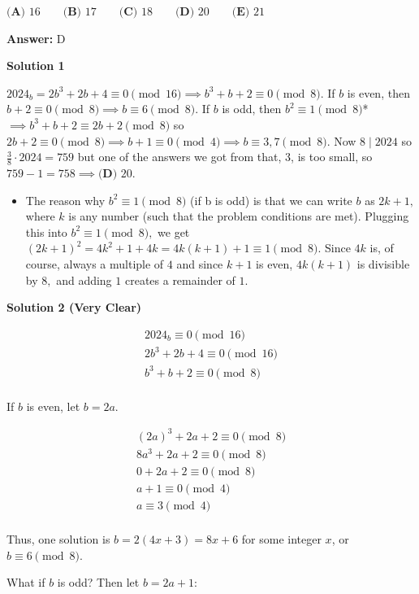 \begin{enumerate}
 $\textbf{(A) }16\qquad\textbf{(B) }17\qquad\textbf{(C) }18\qquad\textbf{(D) }20\qquad\textbf{(E) }21$

 \textbf{Answer: }D



\textbf{Solution 1}

$2024_b = 2b^3+2b+4\equiv 0\pmod{16}\implies b^3+b+2\equiv 0\pmod 8$. If $b$ is even, then $b+2\equiv 0\pmod 8\implies b\equiv 6\pmod 8$. If $b$ is odd, then $b^2\equiv 1\pmod 8$* $\implies b^3+b+2\equiv 2b+2\pmod 8$ so $2b+2\equiv 0\pmod 8\implies b+1\equiv 0\pmod 4\implies b\equiv 3,7\pmod 8$. Now $8\mid 2024$ so $\frac38\cdot 2024=759$ but one of the answers we got from that, $3$, is too small, so $759 - 1 = 758\implies\boxed{\textbf{(D) }20}$.

 
            \begin{itemize}
        \item The reason why $b^2\equiv 1\pmod 8$ (if b is odd) is that we can write $b$ as $2k+1,$ where $k$ is any number (such that the problem conditions are met). Plugging this into $b^2\equiv 1\pmod 8,$ we get $(2k+1)^2=4k^2+1+4k=4k(k+1)+1\equiv 1\pmod 8.$ Since $4k$ is, of course, always a multiple of $4$ and since $k+1$ is even, $4k(k+1)$ is divisible by $8,$ and adding $1$ creates a remainder of $1.$
            \end{itemize}
            



\textbf{Solution 2 (Very Clear)}

\begin{align*}2024_b\equiv0\pmod{16} \\2b^3+2b+4\equiv0\pmod{16} \\b^3+b+2\equiv0\pmod8 \\\end{align*}


 If $b$ is even, let $b=2a$. 

 \begin{align*}(2a)^3+2a+2\equiv0\pmod8 \\8a^3+2a+2\equiv0\pmod8 \\0+2a+2\equiv0\pmod8 \\a+1\equiv0\pmod4 \\a\equiv3\pmod4 \\\end{align*}


 Thus, one solution is $b=2(4x+3)=8x+6$ for some integer $x$, or $b\equiv6\pmod8$. 

 What if $b$ is odd? Then let $b=2a+1$: 


\end{enumerate}
